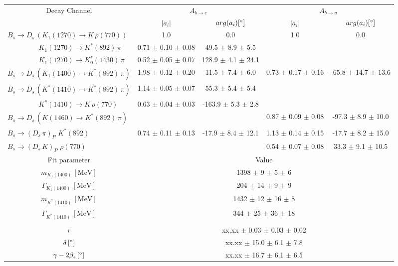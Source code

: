 \begin{tabular}{l c c c c } 
\hline
\hline
\multicolumn{1}{c}{Decay Channel} & \multicolumn{2}{c}{$A_{b \to c}$} & \multicolumn{2}{c}{$A_{b \to u}$}  \\ 
 & \multicolumn{1}{c}{$\vert a_i \vert$}  & \multicolumn{1}{c}{$arg(a_i) [^{\circ}]$}  & \multicolumn{1}{c}{$\vert a_i \vert$} & \multicolumn{1}{c}{$arg(a_i) [^{\circ}]$} \\ 
\hline
 $B_s \to D_s \, ( K_1(1270) \to K \, \rho(770) ) $ &  1.0 & 0.0 & 1.0 & 0.0  \\ 
$\phantom{B_s \to D_s \, (} K_1(1270) \to K^{*}(892) \, \pi \phantom{)} $ & 0.71 $\pm$ 0.10 $\pm$ 0.08 & 49.5 $\pm$ 8.9 $\pm$ 5.5 & &   \\ 
$\phantom{B_s \to D_s \, (} K_1(1270) \to K^{*}_{0}(1430) \, \pi \phantom{)} $ & 0.52 $\pm$ 0.05 $\pm$ 0.07 & 128.9 $\pm$ 4.1 $\pm$ 24.1 & &   \\ 
$B_s \to D_s \, ( K_1(1400) \to K^{*}(892) \, \pi ) $ & 1.98 $\pm$ 0.12 $\pm$ 0.20 & 11.5 $\pm$ 7.4 $\pm$ 6.0 & 0.73 $\pm$ 0.17 $\pm$ 0.16 & -65.8 $\pm$ 14.7 $\pm$ 13.6 \\ 
$B_s \to D_s \, ( K^{*}(1410) \to K^{*}(892) \, \pi ) $ & 1.14 $\pm$ 0.05 $\pm$ 0.07 & 55.3 $\pm$ 5.4 $\pm$ 5.4 &  &  \\ 
$\phantom{B_s \to D_s \, (} K^{*}(1410) \to K \, \rho(770) \phantom{)} $ & 0.63 $\pm$ 0.04 $\pm$ 0.03 & -163.9 $\pm$ 5.3 $\pm$ 2.8 & &   \\ 
$B_s \to D_s \, ( K(1460) \to K^{*}(892) \, \pi ) $ & & &0.87 $\pm$ 0.09 $\pm$ 0.08 & -97.3 $\pm$ 8.9 $\pm$ 10.0 \\ 
$B_s \to ( D_s \, \pi)_{P} \, \, K^{*}(892) $ & 0.74 $\pm$ 0.11 $\pm$ 0.13 & -17.9 $\pm$ 8.4 $\pm$ 12.1 & 1.13 $\pm$ 0.14 $\pm$ 0.15 & -17.7 $\pm$ 8.2 $\pm$ 15.0 \\ 
$B_s \to ( D_s \, K)_{P} \, \, \rho(770) $ & & &0.54 $\pm$ 0.07 $\pm$ 0.08 & 33.3 $\pm$ 9.1 $\pm$ 10.5 \\ 
\hline
\hline
\multicolumn{1}{c}{Fit parameter} & \multicolumn{4}{c}{Value}  \\ 
\hline
\multicolumn{1}{c}{$m_{K_1(1400)} \, [\text{MeV}]$} & \multicolumn{4}{c}{1398 $\pm$ 9 $\pm$ 5 $\pm$ 6} \\ 
\multicolumn{1}{c}{$\Gamma_{K_1(1400)} \, [\text{MeV}]$} & \multicolumn{4}{c}{204 $\pm$ 14 $\pm$ 9 $\pm$ 9} \\ 
\multicolumn{1}{c}{$m_{K^{*}(1410)} \, [\text{MeV}]$} & \multicolumn{4}{c}{1432 $\pm$ 12 $\pm$ 16 $\pm$ 8} \\ 
\multicolumn{1}{c}{$\Gamma_{K^{*}(1410)} \, [\text{MeV}]$} & \multicolumn{4}{c}{344 $\pm$ 25 $\pm$ 36 $\pm$ 18} \\ 
 \\ 
\multicolumn{1}{c}{$r$} & \multicolumn{4}{c}{xx.xx $\pm$ 0.03 $\pm$ 0.03 $\pm$ 0.02} \\ 
\multicolumn{1}{c}{$\delta \, [^{\circ}]$} & \multicolumn{4}{c}{xx.xx $\pm$ 15.0 $\pm$ 6.1 $\pm$ 7.8} \\ 
\multicolumn{1}{c}{$\gamma - 2 \beta_{s} \, [^{\circ}]$} & \multicolumn{4}{c}{xx.xx $\pm$ 16.7 $\pm$ 6.1 $\pm$ 6.5} \\ 
\hline
\hline
\end{tabular}
